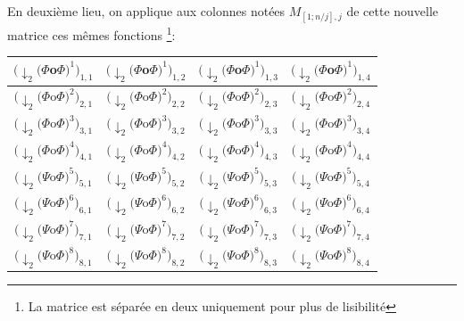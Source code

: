 \documentclass[a4paper,10pt]{report}
\theoremstyle{break}
\begin{document}
	En deuxi\`{e}me lieu, on applique aux colonnes not\'{e}es $M_{[1;n/j], j}$ de cette nouvelle matrice ces m\^{e}mes fonctions 
	\footnote{La matrice est s\'{e}par\'{e}e en deux uniquement pour plus de lisibilit\'{e}}:
	
	\begin{center}
	  \begin{tabular}{| c | c | c | c |}
	      \hline
	      $(\downarrow_2 (\varPhi $o$ \varPhi)^1)_{1,1}$ & $(\downarrow_2 (\varPhi $o$ \varPhi)^1)_{1,2}$ & $(\downarrow_2 (\varPhi $o$ \varPhi)^1)_{1,3}$ & $(\downarrow_2 (\varPhi $o$ \varPhi)^1)_{1,4}$ \\
	      \hline
	      $(\downarrow_2 (\varPhi $o$ \varPhi)^2)_{2,1}$ & $(\downarrow_2 (\varPhi $o$ \varPhi)^2)_{2,2}$ & $(\downarrow_2 (\varPhi $o$ \varPhi)^2)_{2,3}$ & $(\downarrow_2 (\varPhi $o$ \varPhi)^2)_{2,4}$ \\ 
	      \hline
	      $(\downarrow_2 (\varPhi $o$ \varPhi)^3)_{3,1}$ & $(\downarrow_2 (\varPhi $o$ \varPhi)^3)_{3,2}$ & $(\downarrow_2 (\varPhi $o$ \varPhi)^3)_{3,3}$ & $(\downarrow_2 (\varPhi $o$ \varPhi)^3)_{3,4}$ \\
	      \hline
	      $(\downarrow_2 (\varPhi $o$ \varPhi)^4)_{4,1}$ & $(\downarrow_2 (\varPhi $o$ \varPhi)^4)_{4,2}$ & $(\downarrow_2 (\varPhi $o$ \varPhi)^4)_{4,3}$ & $(\downarrow_2 (\varPhi $o$ \varPhi)^4)_{4,4}$ \\
	      \hline
	      \hline
	      $(\downarrow_2 (\varPsi $o$ \varPhi)^5)_{5,1}$ & $(\downarrow_2 (\varPsi $o$ \varPhi)^5)_{5,2}$ & $(\downarrow_2 (\varPsi $o$ \varPhi)^5)_{5,3}$ & $(\downarrow_2 (\varPsi $o$ \varPhi)^5)_{5,4}$ \\
	      \hline
	      $(\downarrow_2 (\varPsi $o$ \varPhi)^6)_{6,1}$ & $(\downarrow_2 (\varPsi $o$ \varPhi)^6)_{6,2}$ & $(\downarrow_2 (\varPsi $o$ \varPhi)^6)_{6,3}$ & $(\downarrow_2 (\varPsi $o$ \varPhi)^6)_{6,4}$ \\
	      \hline
	      $(\downarrow_2 (\varPsi $o$ \varPhi)^7)_{7,1}$ & $(\downarrow_2 (\varPsi $o$ \varPhi)^7)_{7,2}$ & $(\downarrow_2 (\varPsi $o$ \varPhi)^7)_{7,3}$ & $(\downarrow_2 (\varPsi $o$ \varPhi)^7)_{7,4}$ \\
	      \hline
	      $(\downarrow_2 (\varPsi $o$ \varPhi)^8)_{8,1}$ & $(\downarrow_2 (\varPsi $o$ \varPhi)^8)_{8,2}$ & $(\downarrow_2 (\varPsi $o$ \varPhi)^8)_{8,3}$ & $(\downarrow_2 (\varPsi $o$ \varPhi)^8)_{8,4}$ \\
	      \hline
	  \end{tabular}
	  
	  \vspace{1cm}
	  

\end{center}
\end{document}
